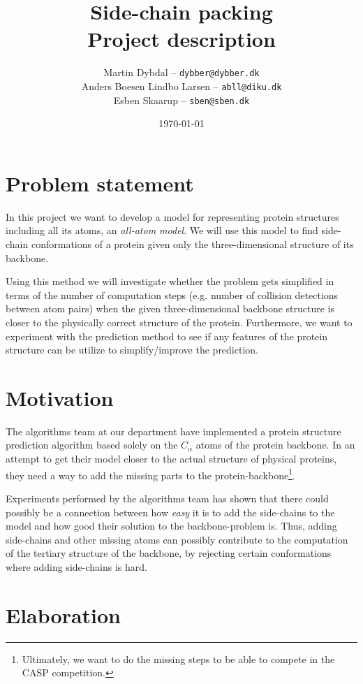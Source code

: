 \documentclass[10pt,a4paper,final,oneside,openany,article]{memoir}
\title{
  Side-chain packing \\
  \small{Project description}
}
\author{
	Martin Dybdal -- \texttt{dybber@dybber.dk}\\
	Anders Boesen Lindbo Larsen -- \texttt{abll@diku.dk} \\
    Esben Skaarup -- \texttt{sben@sben.dk}
}
\date{\today}
\begin{document}
\maketitle

\section{Problem statement}
In this project we want to develop a model for representing protein
structures including all its atoms, an \textit{all-atom model}.  We
will use this model to find side-chain conformations of a protein
given only the three-dimensional structure of its backbone.

Using this method we will investigate whether the problem gets
simplified in terms of the number of computation steps (e.g. number of
collision detections between atom pairs) when the given
three-dimensional backbone structure is closer to the physically
correct structure of the protein.
Furthermore, we want to experiment with the prediction method to see if any features of the protein structure can be utilize to simplify/improve the prediction.


\section{Motivation}
The algorithms team at our department have implemented a protein
structure prediction algorithm based solely on the $C_\alpha$ atoms of
the protein backbone. In an attempt to get their model closer to the
actual structure of physical proteins, they need a way to add the
missing parts to the protein-backbone\footnote{Ultimately, we want to
  do the missing steps to be able to compete in the
  CASP competition.}.

Experiments performed by the algorithms team has shown that there
could possibly be a connection between how \textit{easy} it is to add
the side-chains to the model and how good their solution to the
backbone-problem is. Thus, adding side-chains and other missing atoms
can possibly contribute to the computation of the tertiary structure
of the backbone, by rejecting certain conformations where adding
side-chains is hard.

\section{Elaboration}
\end{document}
